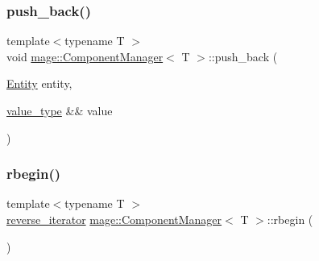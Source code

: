 \mbox{\label{classmage_1_1_component_manager_a62c25a923c959d535d0427bec2ca44cf}} 
\subsubsection{\texorpdfstring{push\+\_\+back()}{push\_back()}\hspace{0.1cm}{\footnotesize\ttfamily [2/2]}}
{\footnotesize\ttfamily template$<$typename T $>$ \\
void \mbox{\hyperlink{classmage_1_1_component_manager}{mage\+::\+Component\+Manager}}$<$ T $>$\+::push\+\_\+back (\begin{DoxyParamCaption}\item[{\mbox{\hyperlink{classmage_1_1_entity}{Entity}}}]{entity,  }\item[{\mbox{\hyperlink{classmage_1_1_component_manager_a56aac3b52842bd8955253fa9b528a58d}{value\+\_\+type}} \&\&}]{value }\end{DoxyParamCaption})}

\mbox{\label{classmage_1_1_component_manager_a0b28b64f6fabcc291f25d1410e56fe90}} 
\subsubsection{\texorpdfstring{rbegin()}{rbegin()}\hspace{0.1cm}{\footnotesize\ttfamily [1/2]}}
{\footnotesize\ttfamily template$<$typename T $>$ \\
\mbox{\hyperlink{classmage_1_1_component_manager_a33e3e4994e4ec77e3ab587d68dbb8277}{reverse\+\_\+iterator}} \mbox{\hyperlink{classmage_1_1_component_manager}{mage\+::\+Component\+Manager}}$<$ T $>$\+::rbegin (\begin{DoxyParamCaption}{ }\end{DoxyParamCaption})\hspace{0.3cm}{\ttfamily [noexcept]}}

\mbox{\label{classmage_1_1_component_manager_a753f35b82bd16f9841476a006b57d383}} 
